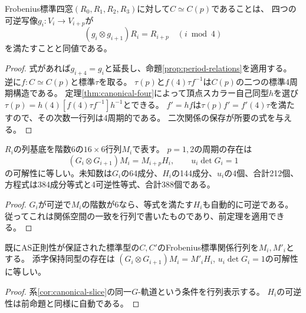 \begin{theorem}[裸の周期性の有限判定]\label{thm:finite-period-test}
Frobenius標準四窓$(R_0,R_1,R_2,R_3)$に対して$C\simeq C(p)$であることは、
四つの可逆写像$g_i:V_i\to V_{i+p}$が
\begin{equation}\label{eq:finite-period-test}
 (g_i\otimes g_{i+1})R_i=R_{i+p}\quad(i\bmod4)
\end{equation}
を満たすことと同値である。
\end{theorem}
\begin{proof}
式があれば$g_{i+4}=g_i$と延長し、命題\ref{prop:period-relations}を適用する。
逆に$f:C\simeq C(p)$と標準$\tau$を取る。
$\tau(p)$と$f(4)\tau f^{-1}$は$C(p)$の二つの標準4周期構造である。
定理\ref{thm:canonical-four}によって頂点スカラー自己同型$h$を選び
$\tau(p)=h(4)[f(4)\tau f^{-1}]h^{-1}$とできる。
$f'=hf$は$\tau(p)f'=f'(4)\tau$を満たすので、その次数一行列は4周期的である。
二次関係の保存が所要の式を与える。
\end{proof}

\begin{proposition}[多項式系]\label{prop:period-polynomial-system}
$R_i$の列基底を階数6の$16\times6$行列$M_i$で表す。
$p=1,2$の周期の存在は
\begin{equation}\label{eq:period-polynomial-system}
 (G_i\otimes G_{i+1})M_i=M_{i+p}H_i,\qquad u_i\det G_i=1
\end{equation}
の可解性に等しい。未知数は$G_i$の64成分、$H_i$の144成分、$u_i$の4個、合計212個、
方程式は384成分等式と4可逆性等式、合計388個である。
\end{proposition}
\begin{proof}
$G_i$が可逆で$M_i$の階数が6なら、等式を満たす$H_i$も自動的に可逆である。
従ってこれは関係空間の一致を行列で書いたものであり、前定理を適用できる。
\end{proof}

\begin{corollary}\label{cor:finite-isom-test}
既にAS正則性が保証された標準型の$C,C'$のFrobenius標準関係行列を$M_i,M'_i$とする。
添字保持同型の存在は
$(G_i\otimes G_{i+1})M_i=M'_iH_i$, $u_i\det G_i=1$の可解性に等しい。
\end{corollary}
\begin{proof}
系\ref{cor:canonical-slice}の同一$G$-軌道という条件を行列表示する。
$H_i$の可逆性は前命題と同様に自動である。
\end{proof}

